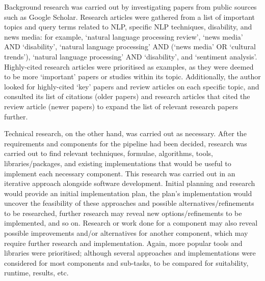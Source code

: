 \documentclass{report}
\begin{document}
Background research was carried out by investigating papers from public sources such as Google Scholar.
Research articles were gathered from a list of important topics and query terms related to NLP, specific NLP techniques, disability, and news media: for example, `natural language processing review', `news media' AND `disability', `natural language processing' AND (`news media' OR `cultural trends'), `natural language processing' AND `disability', and `sentiment analysis'.
Highly-cited research articles were prioritised as examples, as they were deemed to be more `important' papers or studies within its topic.
Additionally, the author looked for highly-cited `key' papers and review articles on each specific topic, and consulted its list of citations (older papers) and research articles that cited the review article (newer papers) to expand the list of relevant research papers further.

Technical research, on the other hand, was carried out as necessary.
After the requirements and components for the pipeline had been decided, research was carried out to find relevant techniques, formulae, algorithms, tools, libraries/packages, and existing implementations that would be useful to implement each necessary component.
This research was carried out in an iterative approach alongside software development. 
Initial planning and research would provide an initial implementation plan, the plan's implementation would uncover the feasibility of these approaches and possible alternatives/refinements to be researched, further research may reveal new options/refinements to be implemented, and so on.
Research or work done for a component may also reveal possible improvements and/or alternatives for another component, which may require further research and implementation.  
Again, more popular tools and libraries were prioritised; although several approaches and implementations were considered for most components and sub-tasks, to be compared for suitability, runtime, results, etc.
\end{document}
